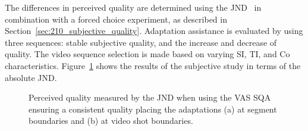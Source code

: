 The differences in perceived quality are determined using the \ac{JND}~\cite{Watson2001} in combination with a forced choice experiment, as described in Section~\ref{sec:210_subjective_quality}.
Adaptation assistance is evaluated by using three sequences: stable subjective quality, and the increase and decrease of quality.
The video sequence selection is made based on varying \ac{SI}, \ac{TI}, and \ac{Co} characteristics.
Figure~\ref{fig:730_eval_subjective} shows the results of the subjective study in terms of the absolute \ac{JND}.
\begin{figure}
\centering

\caption[Perceived quality measured by the JND using VAS]{ 
Perceived quality measured by the \ac{JND} when using the \ac{VAS} \ac{SQA} ensuring a consistent quality placing the adaptations (a) at segment boundaries and (b) at video shot boundaries.}
\label{fig:730_eval_subjective}
\end{figure}
